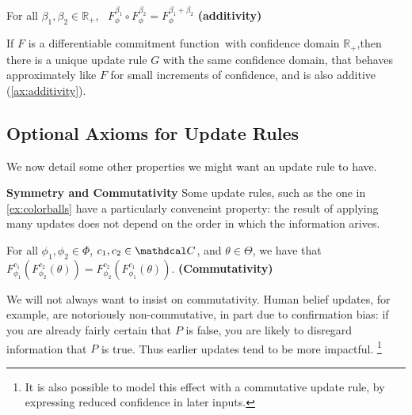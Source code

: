 \documentclass{article}
\def\cofunc{commitment function}
\def\confdom{\mathdcal C}
\def\Rplus{\mathbb R_+}
\begin{document}
\TODO

\begin{CFaxioms}
	\item For all $\beta_1, \beta_2 \in \Rplus$,~
		$F^{\beta_1}_\phi \circ F^{\beta_2}_\phi = F^{\beta_1 + \beta_2}_\phi$
		\hfill \textbf{(additivity)} \label{ax:additivity}
\end{CFaxioms}



\begin{prop}
	If $F$ is a differentiable \cofunc\ with confidence domain $\Rplus$,then there is a unique update rule $G$ with the same confidence domain, that behaves approximately like $F$ for small increments of confidence, and is also additive (\cref{ax:additivity}).
\end{prop}




\subsection{Optional Axioms for Update Rules}

We now detail some other properties we might want an update rule to have.


\textbf{Symmetry and Commutativity}
Some update rules, such as the one in \cref{ex:colorballs} have a particularly conveneint property: the result of applying many updates does not depend on the order in which the information arives.

\begin{CFaxioms}
	\item For all $\phi_1, \phi_2 \in \Phi$,
	 $c_1, c_2 \in \confdom$, and
	$\theta \in \Theta$,
	we have that
	$
		F^{c_1}_{\phi_1} ( F^{c_2}_{\phi_2}(\theta)) =
			F^{c_2}_{\phi_2} ( F^{c_1}_{\phi_1}(\theta)).
	$
	\hfill\textbf{(Commutativity)} \label{ax:commute}
\end{CFaxioms}

We will not always want to insist on commutativity. Human belief updates, for example, are notoriously non-commutative, in part due to confirmation bias:
if you are already fairly certain that $P$ is false, you are likely to disregard
information that $P$ is true. Thus earlier updates tend to be more impactful.%
\footnote{
	It is also possible to model this effect with a commutative update rule,
	by expressing reduced confidence in later inputs.
}
\end{document}

